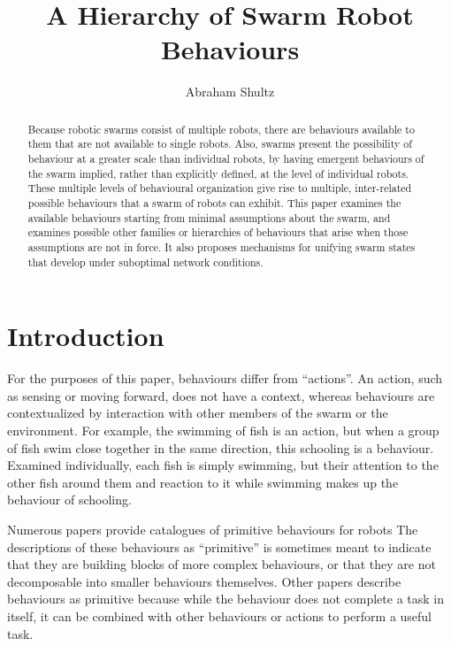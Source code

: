 \documentclass[]{article}
\title{A Hierarchy of Swarm Robot Behaviours}
\author{Abraham Shultz}
\begin{document}
\maketitle

\begin{abstract}
Because robotic swarms consist of multiple robots, there are behaviours available to them that are not available to single robots. Also, swarms present the possibility of behaviour at a greater scale than individual robots, by having emergent behaviours of the swarm implied, rather than explicitly defined, at the level of individual robots. These multiple levels of behavioural organization give rise to multiple, inter-related possible behaviours that a swarm of robots can exhibit. This paper examines the available behaviours starting from minimal assumptions about the swarm, and examines possible other families or hierarchies of behaviours that arise when those assumptions are not in force. It also proposes mechanisms for unifying swarm states that develop under suboptimal network conditions. 

\end{abstract}

\section{Introduction}

For the purposes of this paper, behaviours differ from ``actions''. 
An action, such as sensing or moving forward, does not have a context, whereas behaviours are contextualized by interaction with other members of the swarm or the environment.
For example, the swimming of fish is an action, but when a group of fish swim close together in the same direction, this schooling is a behaviour. 
Examined individually, each fish is simply swimming, but their attention to the other fish around them and reaction to it while swimming makes up the behaviour of schooling. 

Numerous papers provide catalogues of primitive behaviours for robots \cite{nagpal2004catalog, mclurkin2004stupid, evans2000programming}
The descriptions of these behaviours as ``primitive'' is sometimes meant to indicate that they are building blocks of more complex behaviours, or that they are not decomposable into smaller behaviours themselves. 
Other papers describe behaviours as primitive because while the behaviour does not complete a task in itself, it can be combined with other behaviours or actions to perform a useful task. 
\end{document}
